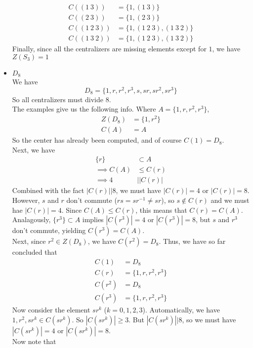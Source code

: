 \documentclass{article}
\newcommand{\set}[1]{ \{ #1 \} }
\newcommand{\inv}[1]{ {#1}^{-1} }
\newcommand{\norm}[1]{|#1|}
\newcommand{\divides}{\big\vert}
\begin{document}
\begin{itemize}
\begin{align*}
C( (1\ 3) ) &= \set{1, (1\ 3)}\\
C( (2\ 3) ) &= \set{1, (2\ 3)}\\
C( (1\ 2\ 3) ) &= \set{1, (1\ 2\ 3), (1\ 3\ 2)}\\
C( (1\ 3\ 2) ) &= \set{1, (1\ 2\ 3), (1\ 3\ 2)}
\end{align*}
Finally, since all the centralizers are missing elements except for $1$, we have $Z(S_3) = 1$
\item $D_8$\\
We have
\begin{equation}
D_8 = \set{1, r, r^2, r^3, s, sr, sr^2, sr^3}
\end{equation}
So all centralizers must divide $8$.\\
The examples give us the following info. Where $A = \set{1,r,r^2,r^3}$,
\begin{align*}
Z(D_8) &= \set{1, r^2}\\
C(A) &= A
\end{align*}
So the center has already been computed, and of course $C(1) = D_8$.\\
Next, we have
\begin{align*}
\set{r} &\subset A\\
\implies C(A) &\leq C(r)\\
\implies 4 &\divides \norm{C(r)}
\end{align*}
Combined with the fact $\norm{C(r)}\divides 8$, we must have $\norm{C(r)}=4$ or $\norm{C(r)}=8$. However, $s$ and $r$ don't commute ($rs = s\inv{r} \neq sr$), so $s \notin C(r)$ and we must hae $\norm{C(r)} = 4$. Since $C(A) \leq C(r)$, this means that $C(r) = C(A)$.\\
Analagously, $\set{r^3} \subset A$ implies $\norm{C(r^3)}=4$ or $\norm{C(r^3)}=8$, but $s$ and $r^3$ don't commute, yielding $C(r^3) = C(A)$.\\
Next, since $r^2 \in Z(D_8)$, we have $C(r^2) = D_8$. Thus, we have so far concluded that
\begin{align*}
C(1) &= D_8\\
C(r) &= \set{1,r,r^2,r^3}\\
C(r^2) &= D_8\\
C(r^3) &= \set{1,r,r^2,r^3}
\end{align*}
Now consider the element $sr^k$ ($k=0,1,2,3$). Automatically, we have $1,r^2,sr^k\in C(sr^k)$. So $\norm{C(sr^k)} \geq 3$. But $\norm{C(sr^k)} \divides 8$, so we must have $\norm{C(sr^k)} = 4$ or $\norm{C(sr^k)} = 8$.\\
Now note that 
\begin{align*}

\end{align*}
\end{itemize}
\end{document}
